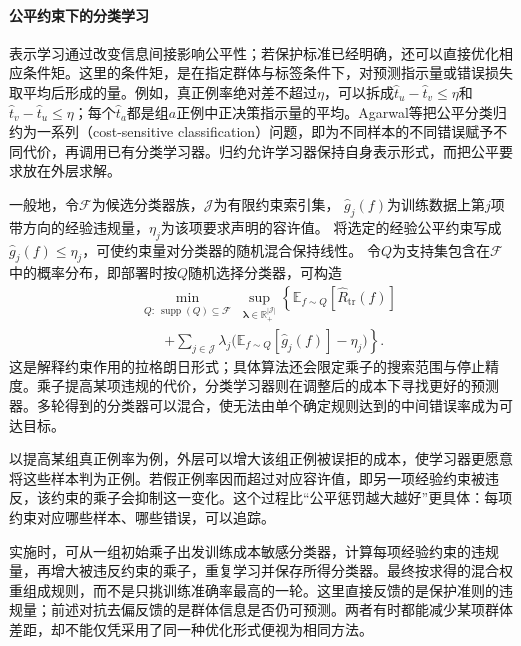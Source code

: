 \paragraph{公平约束下的分类学习}

表示学习通过改变信息间接影响公平性；若保护标准已经明确，还可以直接优化相应条件矩。这里的条件矩，是在指定群体与标签条件下，对预测指示量或错误损失取平均后形成的量。例如，真正例率绝对差不超过$\eta$，可以拆成$\hat t_u-\hat t_v\leq\eta$和$\hat t_v-\hat t_u\leq\eta$；每个$\hat t_a$都是组$a$正例中正决策指示量的平均。Agarwal等把公平分类归约为一系列（cost-sensitive classification）问题，即为不同样本的不同错误赋予不同代价，再调用已有分类学习器。归约允许学习器保持自身表示形式，而把公平要求放在外层求解。

一般地，令$\mathcal F$为候选分类器族，$\mathcal J$为有限约束索引集，
$\hat g_j(f)$为训练数据上第$j$项带方向的经验违规量，$\eta_j$为该项要求声明的容许值。
将选定的经验公平约束写成$\hat g_j(f)\leq\eta_j$，可使约束量对分类器的随机混合保持线性。
令$Q$为支持集包含在$\mathcal F$中的概率分布，即部署时按$Q$随机选择分类器，可构造
\begin{equation}
\begin{aligned}
 &\min_{\substack{Q:\ \operatorname{supp}(Q)\subseteq\mathcal F}}
 \sup_{\bm{\lambda}\in\mathbb R_+^{|\mathcal J|}}
 \left\{\mathbb E_{f\sim Q}[\widehat R_{\mathrm{tr}}(f)]\right.\\
 &\qquad\left.+
 \sum_{j\in\mathcal J}\lambda_j
 \bigl(\mathbb E_{f\sim Q}[\hat g_j(f)]-\eta_j\bigr)
 \right\}.
\end{aligned}
 \label{eq:fairness-reduction}
\end{equation}
这是解释约束作用的拉格朗日形式；具体算法还会限定乘子的搜索范围与停止精度。乘子提高某项违规的代价，分类学习器则在调整后的成本下寻找更好的预测器。多轮得到的分类器可以混合，使无法由单个确定规则达到的中间错误率成为可达目标。

以提高某组真正例率为例，外层可以增大该组正例被误拒的成本，使学习器更愿意将这些样本判为正例。若假正例率因而超过对应容许值，即另一项经验约束被违反，该约束的乘子会抑制这一变化。这个过程比“公平惩罚越大越好”更具体：每项约束对应哪些样本、哪些错误，可以追踪。

实施时，可从一组初始乘子出发训练成本敏感分类器，计算每项经验约束的违规量，再增大被违反约束的乘子，重复学习并保存所得分类器。最终按求得的混合权重组成规则，而不是只挑训练准确率最高的一轮。这里直接反馈的是保护准则的违规量；前述对抗去偏反馈的是群体信息是否仍可预测。两者有时都能减少某项群体差距，却不能仅凭采用了同一种优化形式便视为相同方法。

